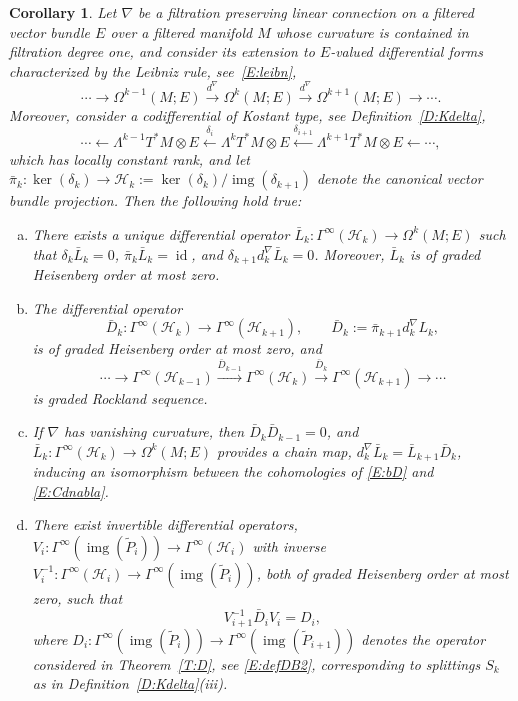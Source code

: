 \documentclass[reqno,12pt]{amsart}
\DeclareMathOperator{\img}{img}
\DeclareMathOperator{\id}{id}
\theoremstyle{plain}
\newtheorem{corollary}[theorem]{Corollary}
\theoremstyle{definition}
\begin{document}
\begin{corollary}\label{C:D}
Let $\nabla$ be a filtration preserving linear connection on a filtered vector bundle $E$ over a filtered manifold $M$ whose curvature is contained in filtration degree one, and consider its extension to $E$-valued differential forms characterized by the Leibniz rule, see~\eqref{E:leibn},
\begin{equation}\label{E:Cdnabla}
\cdots\to\Omega^{k-1}(M;E)\xrightarrow{d^\nabla}\Omega^k(M;E)\xrightarrow{d^\nabla}\Omega^{k+1}(M;E)\to\cdots.
\end{equation}
Moreover, consider a codifferential of Kostant type, see Definition~\ref{D:Kdelta},
$$
\cdots\leftarrow\Lambda^{k-1}T^*M\otimes E\xleftarrow{\delta_i}\Lambda^kT^*M\otimes E\xleftarrow{\delta_{i+1}}\Lambda^{k+1}T^*M\otimes E\leftarrow\cdots,
$$
which has locally constant rank, and let $\bar\pi_k\colon\ker(\delta_k)\to\mathcal H_k:=\ker(\delta_k)/\img(\delta_{k+1})$ denote the canonical vector bundle projection.
Then the following hold true:
\begin{enumerate}[(a)]
\item
There exists a unique differential operator $\bar L_k\colon\Gamma^\infty(\mathcal H_k)\to\Omega^k(M;E)$ such that $\delta_k\bar L_k=0$, $\bar\pi_k\bar L_k=\id$, and $\delta_{k+1}d^\nabla_k\bar L_k=0$.
Moreover, $\bar L_k$ is of graded Heisenberg order at most zero.
\item
The differential operator
$$
\bar D_k\colon\Gamma^\infty(\mathcal H_k)\to\Gamma^\infty(\mathcal H_{k+1}),\qquad\bar D_k:=\bar\pi_{k+1}d^\nabla_kL_k,
$$ 
is of graded Heisenberg order at most zero, and 
\begin{equation}\label{E:bD}
\cdots\to\Gamma^\infty(\mathcal H_{k-1})\xrightarrow{\bar D_{k-1}}\Gamma^\infty(\mathcal H_k)\xrightarrow{\bar D_k}\Gamma^\infty(\mathcal H_{k+1})\to\cdots
\end{equation}
is graded Rockland sequence.
\item
If $\nabla$ has vanishing curvature, then $\bar D_k\bar D_{k-1}=0$, and $\bar L_k\colon\Gamma^\infty(\mathcal H_k)\to\Omega^k(M;E)$ provides a chain map, $d^\nabla_k\bar L_k=\bar L_{k+1}\bar D_k$, inducing an isomorphism between the cohomologies of \eqref{E:bD} and \eqref{E:Cdnabla}.
\item
There exist invertible differential operators, $V_i\colon\Gamma^\infty(\img(\tilde P_i))\to\Gamma^\infty(\mathcal H_i)$ with inverse $V_i^{-1}\colon\Gamma^\infty(\mathcal H_i)\to\Gamma^\infty(\img(\tilde P_i))$, both of graded Heisenberg order at most zero, such that 
$$
V_{i+1}^{-1}\bar D_iV_i=D_i,
$$ 
where $D_i\colon\Gamma^\infty(\img(\tilde P_i))\to\Gamma^\infty(\img(\tilde P_{i+1}))$ denotes the operator considered in Theorem~\ref{T:D}, see \eqref{E:defDB2}, corresponding to splittings $S_k$ as in Definition~\ref{D:Kdelta}(iii).
\end{enumerate}
\end{corollary}
\end{document}
